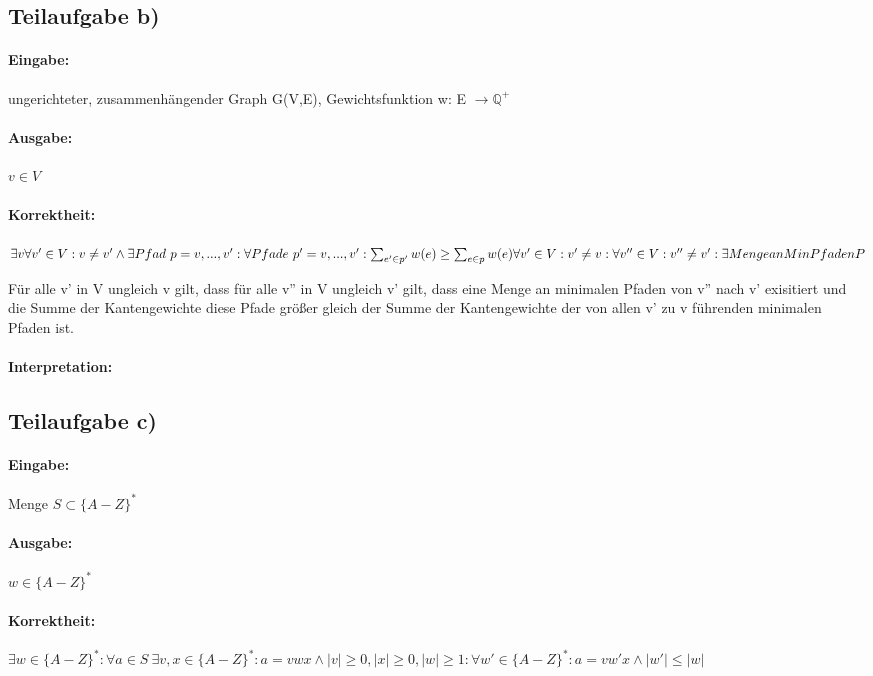 \documentclass[12pt]{scrartcl}%
\theoremstyle{nonumberplain}
\newcommand{\Q}{\mathbb{Q}}
\begin{document}
\subsection*{Teilaufgabe b)}

\paragraph{Eingabe:} ungerichteter, zusammenhängender Graph G(V,E), Gewichtsfunktion w: E $\rightarrow \Q ^+$
\paragraph{Ausgabe:} $v \in V$
\paragraph{Korrektheit:} $\exists v \forall v' \in V: v \not= v' \wedge \exists Pfad \ p = v,...,v': \forall Pfade \ p' = v,...,v':  \sum_{e' \in p'}^{}w(e) \ge \sum_{e \in p}^{}w(e) \\
\forall v' \in V: v' \not= v : \forall v'' \in V: v'' \not= v': \exists Menge an MinPfaden P$

Für alle v' in V ungleich v gilt, dass für alle v'' in V ungleich v' gilt, dass eine Menge an minimalen Pfaden von v'' nach v' exisitiert und die Summe der Kantengewichte diese Pfade größer gleich der Summe der Kantengewichte der von allen v' zu v führenden minimalen Pfaden ist.

\paragraph{Interpretation:}


\subsection*{Teilaufgabe c)}

\paragraph{Eingabe:} Menge $S \subset \{A-Z\}^*$
\paragraph{Ausgabe:} $w \in \{A-Z\}^*$
\paragraph{Korrektheit:} $\exists w \in \{A-Z\}^*: \forall a \in S \ \exists v,x \in \{A-Z\}^*: a = vwx \wedge |v| \ge 0, |x| \ge 0, |w| \ge 1: \forall w' \in \{A-Z\}^*: a = vw'x \wedge  |w'| \le |w|$
\end{document}
